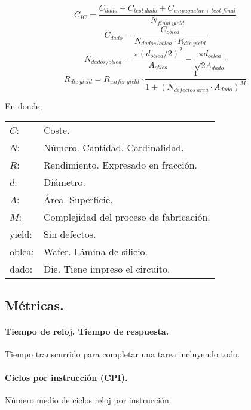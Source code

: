 \documentclass{article}
\begin{document}
\begin{multicols}{2}
		\begin{displaymath}
			C_{IC}=\frac {C_{dado} + C_{test\ dado} + C_{empaquetar+test\ final}} {N_{final\ yield}}
		\end{displaymath}
		\begin{displaymath}
			C_{dado}=\frac {C_{oblea}} {N_{dados/oblea} \cdot R_{die\ yield}}
		\end{displaymath}
		\begin{displaymath}
			N_{dados/oblea} = \frac {\pi ({d_{oblea}} / 2)^2} {A_{oblea}} - \frac {\pi {d_{oblea}}} {\sqrt {2 A_{dado}}}
		\end{displaymath}
		\begin{displaymath}
			R_{die\ yield} = R_{wafer\ yield} \cdot \frac 1 {1+ (N_{defectos\ \acute{a}rea} \cdot A_{dado})^M}
		\end{displaymath}
		
		En donde,
		
		\begin{tabular}{ll}
			$C$: & Coste. \\
			$N$: & Número. Cantidad. Cardinalidad. \\
			$R$: & Rendimiento. Expresado en fracción.\\
			$d$: & Diámetro. \\
			$A$: & Área. Superficie. \\
			$M$: & Complejidad del proceso de fabricación. \\
			yield: & Sin defectos. \\
			oblea: & Wafer. Lámina de silicio. \\
			dado: & Die. Tiene impreso el circuito. \\
		\end{tabular}
		
		\subsection{Métricas.}
		
		\paragraph{Tiempo de reloj. Tiempo de respuesta.}
		Tiempo transcurrido para completar una tarea incluyendo todo.
		
		\paragraph{Ciclos por instrucción (CPI).}
		Número medio de ciclos reloj por instrucción.
		

\end{multicols}
\end{document}
